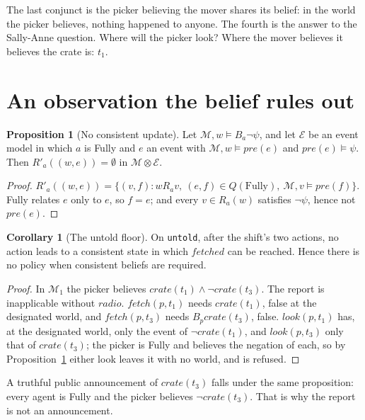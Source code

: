 \documentclass[11pt,a4paper]{article}
\theoremstyle{definition}
\newtheorem{proposition}{Proposition}
\newtheorem{corollary}{Corollary}
\newcommand{\Mod}{\mathcal{M}}
\newcommand{\Ev}{\mathcal{E}}
\newcommand{\prd}{\otimes}
\newcommand{\Bop}[1]{B_{#1}}
\newcommand{\code}[1]{\texttt{\small #1}}
\newcommand{\ag}[1]{\mathit{#1}}
\newcommand{\pk}{\ag{p}}
\newcommand{\crate}{\mathit{crate}}
\newcommand{\pre}{\mathit{pre}}
\begin{document}
\noindent
The last conjunct is the picker believing the mover shares its belief: in the
world the picker believes, nothing happened to anyone. The fourth is the answer
to the Sally-Anne question. Where will the picker look? Where the mover believes
it believes the crate is: $t_1$.

\section{An observation the belief rules out}
\label{sec:collapse}

\begin{proposition}[No consistent update]
\label{prop:collapse}
Let $\Mod, w \models \Bop{a}\neg\psi$, and let $\Ev$ be an event model in which
$a$ is Fully and $e$ an event with $\Mod, w \models \pre(e)$ and
$\pre(e) \models \psi$. Then $R'_a((w,e)) = \emptyset$ in $\Mod \prd \Ev$.
\end{proposition}

\begin{proof}
$R'_a((w,e)) = \{(v,f) : w R_a v,\ (e,f) \in Q(\mathrm{Fully}),\ \Mod, v \models
\pre(f)\}$. Fully relates $e$ only to $e$, so $f = e$; and every $v \in R_a(w)$
satisfies $\neg\psi$, hence not $\pre(e)$.
\end{proof}

\begin{corollary}[The untold floor]
\label{cor:untold}
On \code{untold}, after the shift's two actions, no action leads to a
consistent state in which $\mathit{fetched}$ can be reached. Hence there is no
policy when consistent beliefs are required.
\end{corollary}

\begin{proof}
In $\Mod_1$ the picker believes $\crate(t_1) \wedge \neg\crate(t_3)$. The report
is inapplicable without $\mathit{radio}$. $\mathit{fetch}(\pk, t_1)$ needs
$\crate(t_1)$, false at the designated world, and $\mathit{fetch}(\pk, t_3)$
needs $\Bop{\pk}\crate(t_3)$, false. $\mathit{look}(\pk, t_1)$ has, at the
designated world, only the event of $\neg\crate(t_1)$, and
$\mathit{look}(\pk, t_3)$ only that of $\crate(t_3)$; the picker is Fully and
believes the negation of each, so by Proposition~\ref{prop:collapse} either
look leaves it with no world, and is refused.
\end{proof}

\noindent
A truthful public announcement of $\crate(t_3)$ falls under the same
proposition: every agent is Fully and the picker believes $\neg\crate(t_3)$.
That is why the report is not an announcement.
\end{document}
